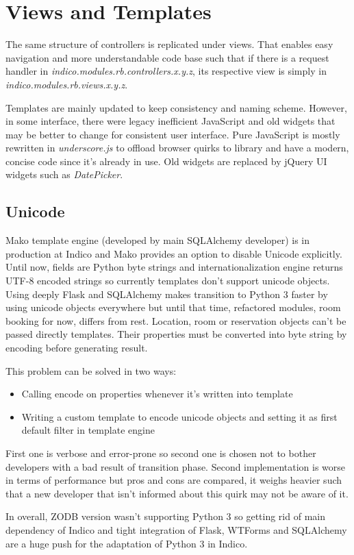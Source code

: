 \section{Views and Templates}

The same structure of controllers is replicated under views. That enables easy navigation and more understandable code base such that if there is a request handler in \textit{indico.modules.rb.controllers.x.y.z}, its respective view is simply in \textit{indico.modules.rb.views.x.y.z}.

Templates are mainly updated to keep consistency and naming scheme. However, in some interface, there were legacy inefficient JavaScript and old widgets that may be better to change for consistent user interface. Pure JavaScript is mostly rewritten in \textit{underscore.js} to offload browser quirks to library and have a modern, concise code since it's already in use. Old widgets are replaced by jQuery UI widgets such as \textit{DatePicker}.

\subsection{Unicode}

Mako template engine (developed by main SQLAlchemy developer) is in production at Indico and Mako provides an option to disable Unicode explicitly. Until now, fields are Python byte strings and internationalization engine returns UTF-8 encoded strings so currently templates don't support unicode objects. Using deeply Flask and SQLAlchemy makes transition to Python 3 faster by using unicode objects everywhere but until that time, refactored modules, room booking for now, differs from rest. Location, room or reservation objects can't be passed directly templates. Their properties must be converted into byte string by encoding before generating result.

This problem can be solved in two ways:
\begin{itemize}
  \item Calling encode on properties whenever it's written into template
  \item Writing a custom template to encode unicode objects and setting it as first default filter in template engine
\end{itemize}

First one is verbose and error-prone so second one is chosen not to bother developers with a bad result of transition phase. Second implementation is worse in terms of performance but pros and cons are compared, it weighs heavier such that a new developer that isn't informed about this quirk may not be aware of it.

In overall, ZODB version wasn't supporting Python 3 so getting rid of main dependency of Indico and tight integration of Flask, WTForms and SQLAlchemy are a huge push for the adaptation of Python 3 in Indico.